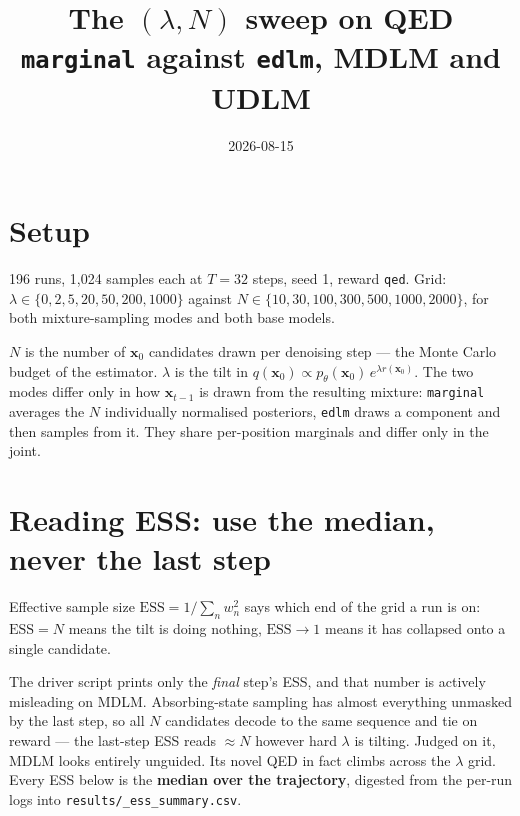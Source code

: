 \documentclass[11pt]{article}
\title{The $(\lambda, N)$ sweep on QED\\\large \texttt{marginal} against \texttt{edlm}, MDLM and UDLM}
\author{}\date{2026-08-15}
\begin{document}
\maketitle
\section{Setup}

196 runs, 1{,}024 samples each at $T=32$ steps, seed 1, reward
\texttt{qed}. Grid: $\lambda \in \{0, 2, 5, 20, 50, 200, 1000\}$ against
$N \in \{10, 30, 100, 300, 500, 1000, 2000\}$, for both mixture-sampling modes
and both base models.

$N$ is the number of $\mathbf{x}_0$ candidates drawn per denoising step --- the
Monte Carlo budget of the estimator. $\lambda$ is the tilt in
$q(\mathbf{x}_0) \propto p_\theta(\mathbf{x}_0)\,e^{\lambda r(\mathbf{x}_0)}$.
The two modes differ only in how $\mathbf{x}_{t-1}$ is drawn from the resulting
mixture: \texttt{marginal} averages the $N$ individually normalised posteriors,
\texttt{edlm} draws a component and then samples from it. They share
per-position marginals and differ only in the joint.

\section{Reading ESS: use the median, never the last step}

Effective sample size $\mathrm{ESS} = 1/\sum_n w_n^2$ says which end of the grid
a run is on: $\mathrm{ESS}=N$ means the tilt is doing nothing, $\mathrm{ESS}\to1$
means it has collapsed onto a single candidate.

The driver script prints only the \emph{final} step's ESS, and that number is
actively misleading on MDLM. Absorbing-state sampling has almost everything
unmasked by the last step, so all $N$ candidates decode to the same sequence and
tie on reward --- the last-step ESS reads $\approx N$ however hard $\lambda$ is
tilting. Judged on it, MDLM looks entirely unguided. Its novel QED in fact climbs
across the $\lambda$ grid. Every ESS below is the \textbf{median over the
trajectory}, digested from the per-run logs into
\texttt{results/\_ess\_summary.csv}.
\end{document}
